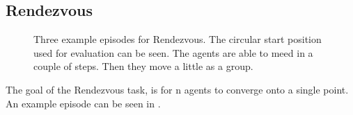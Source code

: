 \subsection{Rendezvous}
\begin{figure}[htp]
    \centering
    \hspace{1cm}                       
    \caption{Three example episodes for Rendezvous. The circular start position used for evaluation can be seen. The agents are able to meed in a couple of steps. Then they move a little as a group.}
    \label{fig:rendezvous_example}
\end{figure}

The goal of the Rendezvous task, is for n agents to converge onto a single point. An example episode can be seen in .\par

